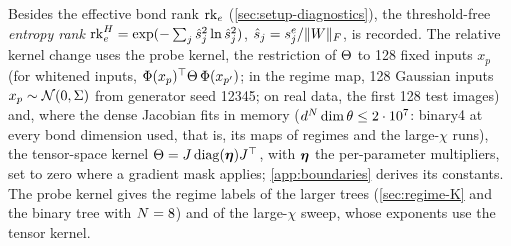 Besides the effective bond rank $\operatorname{rk}_{e}$ (\cref{sec:setup-diagnostics}), the
threshold-free \emph{entropy rank} $\operatorname{rk}^{H}_{e}=\exp(-\sum_j\hat s_j^2\ln\hat s_j^2)$, $\hat s_j=s^{e}_{j}/\lVert W\rVert_{F}$,
is recorded. The relative kernel change uses the probe kernel, the restriction of $\Theta$ to 128 fixed inputs
$x_p$ (for whitened inputs, $\Phi(x_p)^{\top}\Theta\,\Phi(x_{p'})$; in the regime map, 128 Gaussian inputs
$x_p\sim\mathcal{N}(0,\Sigma)$ from generator seed 12345; on real data, the first 128 test images) and, where the
dense Jacobian fits in memory ($d^N\dim\theta\le2\cdot10^7$: binary4 at every bond dimension used, that
is, its maps of regimes and the large-$\chi$ runs), the tensor-space kernel $\Theta=J\operatorname{diag}(\boldsymbol{\eta})J^{\top}$, with
$\boldsymbol{\eta}$ the per-parameter multipliers, set to zero where a gradient mask applies;
\cref{app:boundaries} derives its constants. The probe kernel gives the regime labels of the larger trees
(\cref{sec:regime-K} and the binary tree with $N=8$) and of the large-$\chi$ sweep, whose exponents use the
tensor kernel.

